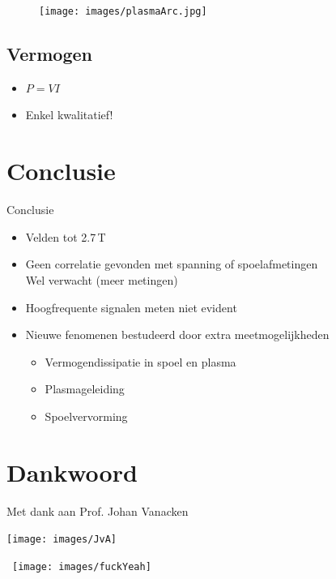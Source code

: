 \documentclass{beamer}
\newcommand{\includeGraph}[2]{
	\begin{center}
	\scalebox{#1}{
		
	}
	\end{center}
}
\begin{document}
\begin{frame}
\begin{figure}[c] \texttt{[image: images/plasmaArc.jpg]}
\end{figure}
\end{frame}

\subsection{Vermogen}
\begin{frame}
\begin{itemize}
\item $P = VI$
\item Enkel kwalitatief!
\end{itemize}
\includeGraph{0.7}{power}
\end{frame}

\section{Conclusie}
\begin{frame}
Conclusie
\begin{itemize}
\item Velden tot 2.7\,T
\item Geen correlatie gevonden met spanning of spoelafmetingen \\
	Wel verwacht (meer metingen)
\item Hoogfrequente signalen meten niet evident
\item Nieuwe fenomenen bestudeerd door extra meetmogelijkheden
\begin{itemize}
	\item Vermogendissipatie in spoel en plasma
	\item Plasmageleiding
	\item Spoelvervorming
\end{itemize}
\end{itemize}
\end{frame}

\section{Dankwoord}
\begin{frame}
\centering Met dank aan Prof. Johan Vanacken \\
\begin{center}
	\texttt{[image: images/JvA]}
\end{center}
\end{frame}

{
\begin{frame}[plain]
\begin{center}
\mbox{
	\hspace{-3cm}
		\texttt{[image: images/fuckYeah]}
	\hspace{-3cm}
}
\end{center}
\end{frame}
}
\end{document}
